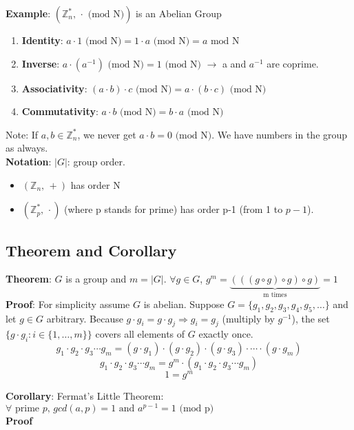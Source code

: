 \documentclass{scribe}
\begin{document}
\noindent\textbf{Example}: $(\mathbb{Z}_n^{*} \text{, } \cdot \text{ (mod N)})$ is an Abelian Group
\begin{enumerate}
    \item \textbf{Identity}: $ a \cdot 1 \text{ (mod N)} = 1 \cdot a \text{ (mod N)} = a \text{ mod N}$
    \item \textbf{Inverse}: $a \cdot (a^{-1}) \text{ (mod N)} = 1 \text{ (mod N)}$  $\rightarrow$  a and $a^{-1}$ are coprime.
    \item \textbf{Associativity}: $(a \cdot b)\cdot c \text{ (mod N)} = a \cdot (b \cdot c) \text{ (mod N)} $
    \item \textbf{Commutativity}: $a \cdot b \text{ (mod N)} = b \cdot a \text{ (mod N)}$
\end{enumerate}
\indent *Note: If $a,b \in \mathbb{Z}_n^{*}$, we never get $a \cdot b=0 \text{ (mod N)}$. We have numbers in the group as always.
\vspace{5mm}
\\\noindent\textbf{Notation}: $|G|$: group order. 
\begin{itemize}
    \item  $(\mathbb{Z}_n \text{, } + )$ has order N
    \item  $(\mathbb{Z}_p^{*} \text{, } \cdot )$ (where p stands for prime) has order p-1 (from 1 to $p-1$).
\end{itemize}
\vspace{8mm}
\subsection{Theorem and Corollary}

\textbf{Theorem}: $G$ is a group and $m=|G|$. $\forall g \in G$, $g^m = \underbrace{(((g \circ g) \circ g) \circ g)}_{\text{m times}}=1$
\\\noindent\textbf{Proof}: For simplicity assume $G$ is abelian. Suppose $G = \{g_1, g_2, g_3, g_4, g_5, \dots\}$ and let $g \in G$ arbitrary.
Because $g \cdot g_i = g \cdot g_j \Rightarrow g_i = g_j$ (multiply by $g^{-1}$), the set $\{g \cdot g_i : i \in \{1, \dots, m\}\}$ covers all elements of $G$ exactly once.
\[g_1 \cdot g_2 \cdot g_3 \cdots g_m = (g \cdot g_1) \cdot (g \cdot g_2) \cdot (g \cdot g_3) \cdot \cdots \cdot (g \cdot g_m)\]  
\[g_1 \cdot g_2 \cdot g_3 \cdots g_m = g^{m} \cdot (g_1 \cdot g_2 \cdot g_3 \cdots g_m)\]
\[ 1 = g^{m}\]
\vspace{5mm}

\noindent\textbf{Corollary}: Fermat's Little Theorem: $\forall \text{ prime } p \text{, } gcd(a,p)=1 \text{ and } a^{p-1} = 1 \text{ (mod p)}$
\\\noindent\textbf{Proof}
\end{document}
